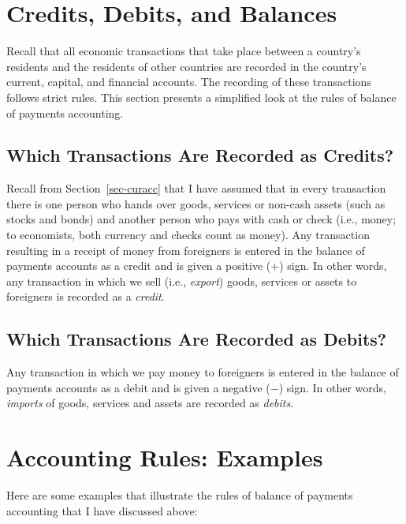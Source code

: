 \documentclass[
  letterpaper,
]{book}
\begin{document}
\section{Credits, Debits, and
Balances}\label{sec-credits-debits-balances}

Recall that all economic transactions that take place between a
country's residents and the residents of other countries are recorded in
the country's current, capital, and financial accounts. The recording of
these transactions follows strict rules. This section presents a
simplified look at the rules of balance of payments accounting.

\subsection{Which Transactions Are Recorded as
Credits?}\label{sec-credits}

Recall from Section~\ref{sec-curacc} that I have assumed that in every
transaction there is one person who hands over goods, services or
non-cash assets (such as stocks and bonds) and another person who pays
with cash or check (i.e., money; to economists, both currency and checks
count as money). Any transaction resulting in a receipt of money from
foreigners is entered in the balance of payments accounts as a
credit and is given a positive
(\(+\)) sign. In other words, any transaction in which we sell (i.e.,
\emph{export}) goods, services or assets to foreigners is recorded as a
\emph{credit}.

\subsection{Which Transactions Are Recorded as
Debits?}\label{sec-debits}

Any transaction in which we pay money to foreigners is entered in the
balance of payments accounts as a
debit and is given a negative (\(-\))
sign. In other words, \emph{imports} of goods, services and assets are
recorded as \emph{debits}.

\section{Accounting Rules: Examples}\label{sec-accex}

Here are some examples that illustrate the rules of balance of payments
accounting that I have discussed above:
\end{document}
